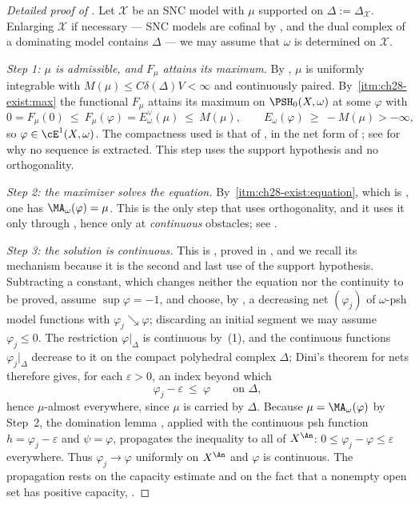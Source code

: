 \begin{proof}[Detailed proof of ]
Let $\mathcal X$ be an SNC model with $\mu$ supported on
$\Delta:=\Delta_{\mathcal X}$.  Enlarging $\mathcal X$ if necessary --- SNC
models are cofinal by , and the dual complex of a
dominating model contains $\Delta$ --- we may assume that $\omega$ is
determined on $\mathcal X$.

\emph{Step 1: $\mu$ is admissible, and $F_\mu$ attains its maximum.}
By , $\mu$ is uniformly integrable with
$M(\mu)\leq C\delta(\Delta)V<\infty$ and continuously paired.  By
\,\cref{itm:ch28-exist:max} the
functional $F_\mu$ attains its maximum on $\PSH_0(X,\omega)$ at some
$\varphi$ with
\[
 0=F_\mu(0)\ \leq\ F_\mu(\varphi)=E^\vee_\omega(\mu)\ \leq\ M(\mu),
 \qquad
 E_\omega(\varphi)\ \geq\ -M(\mu)>-\infty ,
\]
so $\varphi\in\cE^1(X,\omega)$.  The compactness used is that of
, in the net form of
; see  for why no
sequence is extracted.  This step uses the support hypothesis and no
orthogonality.

\emph{Step 2: the maximizer solves the equation.}  By
\,\cref{itm:ch28-exist:equation}, which
is , one has
$\MA_\omega(\varphi)=\mu$.  This is the only step that uses
orthogonality, and it uses it only through
, hence only at \emph{continuous}
obstacles; see .

\emph{Step 3: the solution is continuous.}  This is
, proved in
, and we recall its mechanism because it is the
second and last use of the support hypothesis.  Subtracting a constant,
which changes neither the equation nor the continuity to be proved, assume
$\sup\varphi=-1$, and choose, by
, a decreasing net
$(\varphi_j)$ of $\omega$-psh model functions with
$\varphi_j\searrow\varphi$; discarding an initial segment we may assume
$\varphi_j\leq0$.  The restriction $\varphi|_\Delta$ is continuous by
\,(1), and the continuous functions
$\varphi_j|_\Delta$ decrease to it on the compact polyhedral complex
$\Delta$; Dini's theorem for nets therefore gives, for each
$\varepsilon>0$, an index beyond which
\[
 \varphi_j-\varepsilon\ \leq\ \varphi
 \qquad\text{on }\Delta ,
\]
hence $\mu$-almost everywhere, since $\mu$ is carried by $\Delta$.
Because $\mu=\MA_\omega(\varphi)$ by Step~2, the domination lemma
, applied with the continuous psh
function $h=\varphi_j-\varepsilon$ and $\psi=\varphi$, propagates the
inequality to all of $X^{\An}$:
$0\leq\varphi_j-\varphi\leq\varepsilon$ everywhere.  Thus
$\varphi_j\to\varphi$ uniformly on $X^{\An}$ and $\varphi$ is
continuous.  The propagation rests on the capacity estimate
 and on the fact that a nonempty open set
has positive capacity, .


\end{proof}
